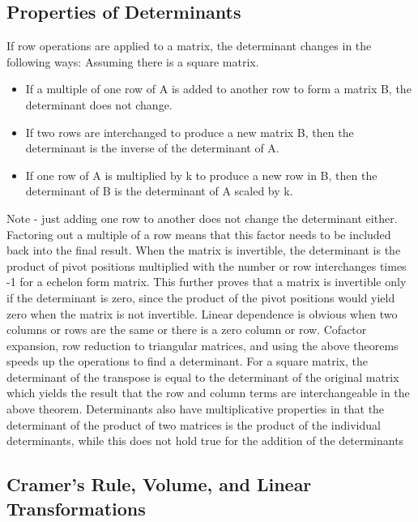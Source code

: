 \documentclass[12pt]{article}
\begin{document}
\subsection{Properties of Determinants}
If row operations are applied to a matrix, the determinant changes in the following ways:
\newline
\newline
\newline
\newline
Assuming there is a square matrix.
\begin{itemize}
    \item If a multiple of one row of A is added to another row to form a matrix B, the determinant does not change. 
    \item If two rows are interchanged to produce a new matrix B, then the determinant is the inverse of the determinant of A.
    \item If one row of A is multiplied by k to produce a new row in B, then the determinant of B is the determinant of A scaled by k.
\end{itemize}
Note - just adding one row to another does not change the determinant either. Factoring out a multiple of a row means that this factor needs to be included %
back into the final result. When the matrix is invertible, the determinant is the product of pivot positions multiplied with the number or row interchanges times -1
for a echelon form matrix. This further proves that a matrix is invertible only if the determinant is zero, since the product of the pivot positions would %
yield zero when the matrix is not invertible. Linear dependence is obvious when two columns or rows are the same or there is a zero column or row. Cofactor %
expansion, row reduction to triangular matrices, and using the above theorems speeds up the operations to find a determinant. For a square matrix, the determinant %
of the transpose is equal to the determinant of the original matrix which yields the result that the row and column terms are interchangeable in the above theorem. %
Determinants also have multiplicative properties in that the determinant of the product of two matrices is the product of the individual determinants, while this %
does not hold true for the addition of the determinants
\subsection{Cramer's Rule, Volume, and Linear Transformations}
\end{document}
